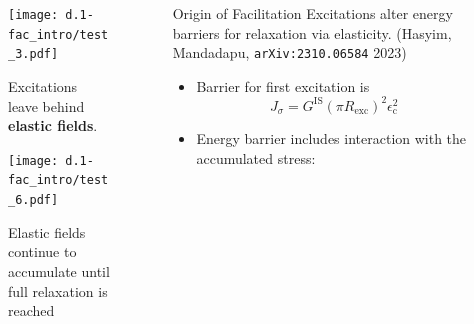 \begin{frame}
\begin{columns}[T]
\begin{column}[T]{0.5\textwidth}
\begin{figure}[t]
\begin{overprint}
\texttt{[image: d.1-fac\_intro/test\_3.pdf]}\vspace{-10pt}\caption{Excitations leave behind \textbf{elastic fields}.}

\texttt{[image: d.1-fac\_intro/test\_6.pdf]}\vspace{-10pt}\caption{Elastic fields continue to accumulate until full relaxation is reached}

\end{overprint}
\end{figure}

\end{column}

\begin{column}[T]{0.5\textwidth}
\vspace{-12pt}
\begin{block}{\centering \large Origin of Facilitation}
\centering Excitations alter energy barriers for relaxation via elasticity.
{\footnotesize (Hasyim, Mandadapu,  \texttt{arXiv:2310.06584} 2023)}
\end{block}

\begin{itemize}
    \item<2->Barrier for first excitation is 
    \begin{equation*}
    J_\sigma = G^\mathrm{IS} (\pi R_\mathrm{exc})^2 \epsilon_\mathrm{c}^2
    \end{equation*}
    \item<9-> Energy barrier includes interaction with the accumulated stress:
\end{itemize}

\end{column}
\end{columns}

\end{frame}
